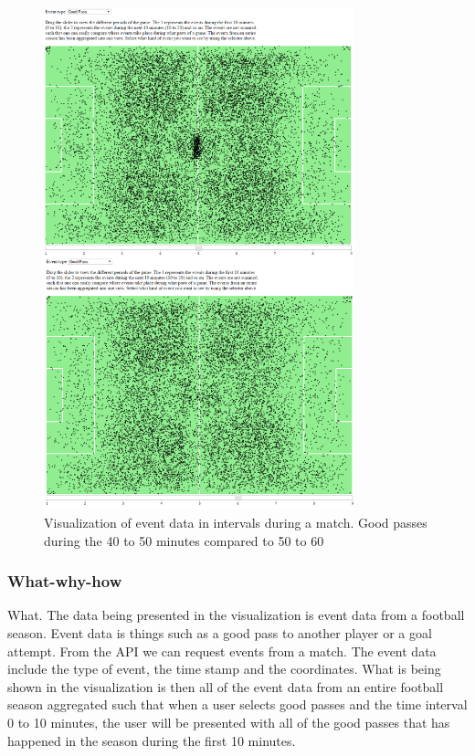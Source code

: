 \documentclass[Report.tex]{subfiles}
\begin{document}
\begin{figure}
\center
\includegraphics[width=0.8\textwidth]{"Figures/events_1_2"}
\caption{Visualization of event data in intervals during a match. Good passes during the 40 to 50 minutes compared to 50 to 60}
\label{Fig:Events}
\end{figure}

\subsubsection{What-why-how}
What. The data being presented in the visualization is event data from a football season. Event data is things such as a good pass to another player or a goal attempt. From the API we can request events from a match. The event data include the type of event, the time stamp and the coordinates. What is being shown in the visualization is then all of the event data from an entire football season aggregated such that when a user selects good passes and the time interval 0 to 10 minutes, the user will be presented with all of the good passes that has happened in the season during the first 10 minutes.\\
\end{document}
